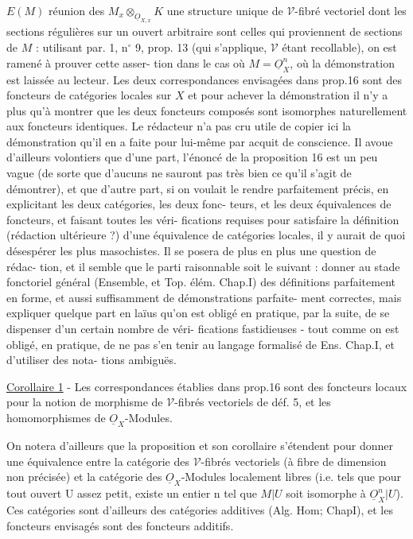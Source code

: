

$E(M)$ réunion des $M_x \otimes_{\underline{O}_{X,x}} K$ une structure unique de $\mathcal{V}$-fibré vectoriel
dont les sections régulières sur un ouvert arbitraire sont celles qui
proviennent de sections de $M$ : utilisant par. 1, n$^\circ$ 9, prop. 13 (qui
s'applique, $\mathcal{V}$ étant recollable), on est ramené à prouver cette asser-
tion dans le cas où $M = \underline{O}_X^n$, où la démonstration est laissée au lecteur.
Les deux correspondances envisagées dans prop.16 sont des foncteurs de
catégories locales sur $X$ et pour achever la démonstration il n'y a plus
qu'à montrer que les deux foncteurs composés sont isomorphes naturellement
aux foncteurs identiques. Le rédacteur n'a pas cru utile de copier ici
la démonstration qu'il en a faite pour lui-même par acquit de conscience.
Il avoue d'ailleurs volontiers que d'une part, l'énoncé de la proposition
16 est un peu vague (de sorte que d'aucuns ne sauront pas très bien ce
qu'il s'agit de démontrer), et que d'autre part, si on voulait le rendre
parfaitement précis, en explicitant les deux catégories, les deux fonc-
teurs, et les deux équivalences de foncteurs, et faisant toutes les véri-
fications requises pour satisfaire la définition (rédaction ultérieure ?)
d'une équivalence de catégories locales, il y aurait de quoi désespérer
les plus masochistes. Il se posera de plus en plus une question de rédac-
tion, et il semble que le parti raisonnable soit le suivant : donner au
stade fonctoriel général (Ensemble, et Top. élém. Chap.I) des définitions
parfaitement en forme, et aussi suffisamment de démonstrations parfaite-
ment correctes,  mais expliquer quelque part en laïus qu'on est obligé
en pratique, par la suite, de se dispenser d'un certain nombre de véri-
fications fastidieuses - tout comme on est obligé, en pratique, de ne pas
s'en tenir au langage formalisé de Ens. Chap.I, et d'utiliser des nota-
tions ambiguës.

\newpage



\underline{Corollaire 1} - Les correspondances établies dans prop.16 sont des foncteurs locaux pour la notion de morphisme de $\mathcal{V}$-fibrés vectoriels de déf. 5, et les homomorphismes de $\underline{O}_X$-Modules.

On notera d'ailleurs que la proposition et son corollaire s'étendent pour donner une équivalence entre la catégorie des $\mathcal{V}$-fibrés vectoriels (à fibre de dimension non précisée) et la catégorie des $\underline{O}_X$-Modules localement libres (i.e. tels que pour tout ouvert U assez petit, existe un entier n tel que $M|U$ soit isomorphe à $\underline{O}_X^n|U$). Ces catégories sont d'ailleurs des catégories additives (Alg. Hom; ChapI), et les foncteurs envisagés sont des foncteurs additifs.

